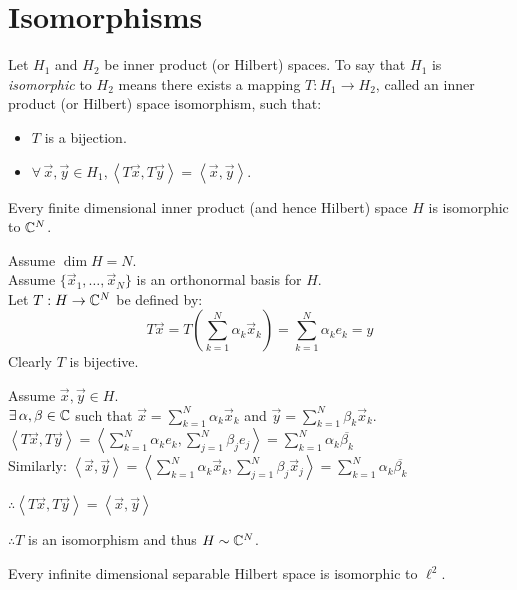 \documentclass[letterpaper,12pt,fleqn]{article}
\newcommand{\vx}{\vec{x}}
\newcommand{\vy}{\vec{y}}
\renewcommand{\a}{\alpha}
\renewcommand{\b}{\beta}
\newcommand{\inner}[1]{\left<#1\right>}
\newcommand{\conj}[1]{\overline{#1}}
\begin{document}
\section*{Isomorphisms}

\begin{definition}[Isomorphism]
  Let $H_1$ and $H_2$ be inner product (or Hilbert) spaces. To say that $H_1$
  is \emph{isomorphic} to $H_2$ means there exists a mapping $T:H_1\to H_2$,
  called an inner product (or Hilbert) space isomorphism, such that:
  \begin{itemize}
  \item $T$ is a bijection.
  \item $\forall\,\vx,\vy\in H_1,\inner{T\vx,T\vy}=\inner{\vx,\vy}$.
  \end{itemize}
\end{definition}

\begin{theorem}
  Every finite dimensional inner product (and hence Hilbert) space $H$ is
  isomorphic to $\mathbb{C}^N$.
\end{theorem}

\begin{theproof}
  Assume $\dim H=N$. \\
  Assume $\{\vx_1,\ldots,\vx_N\}$ is an orthonormal basis for $H$. \\
  Let $T:H\to\mathbb{C}^N$ be defined by:
  \[T\vx=T\left(\sum_{k=1}^N\a_k\vx_k\right)=\sum_{k=1}^N\a_ke_k=y\]
  Clearly $T$ is bijective.
  
  Assume $\vx,\vy\in H$. \\
  $\exists\,\a,\b\in\C$ such that $\vx=\sum_{k=1}^N\a_k\vx_k$ and
  $\vy=\sum_{k=1}^N\b_k\vx_k$. \\
  $\inner{T\vx,T\vy}=\inner{\sum_{k=1}^N\a_ke_k,\sum_{j=1}^N\b_je_j}=
  \sum_{k=1}^N\a_k\conj{\b_k}$ \\
  Similarly:
  $\inner{\vx,\vy}=\inner{\sum_{k=1}^N\a_k\vx_k,\sum_{j=1}^N\b_j\vx_j}=
  \sum_{k=1}^N\a_k\conj{\b_k}$

  $\therefore\inner{T\vx,T\vy}=\inner{\vx,\vy}$

  $\therefore T$ is an isomorphism and thus $H\sim\mathbb{C}^N$.
\end{theproof}

\begin{theorem}
  Every infinite dimensional separable Hilbert space is isomorphic to $\ell^2$.
\end{theorem}
\end{document}
